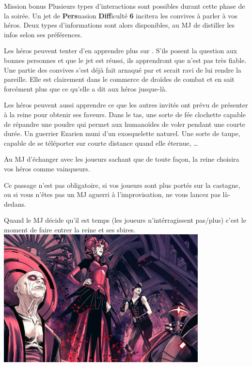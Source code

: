 \begin{paperbox}{Mission bonus}
Plusieurs types d’interactions sont possibles durant cette phase de la soirée. Un jet de \textbf{Pers}uasion \textbf{Diff}iculté \textbf{6} incitera les convives à parler à vos héros. Deux types d’informations sont alors disponibles, au MJ de distiller les infos selon ses préférences.

Les héros peuvent tenter d’en apprendre plus sur . S’ils posent la question aux bonnes personnes et que le jet est réussi, ils apprendront que  n’est pas très fiable. Une partie des convives s’est déjà fait arnaqué par  et serait ravi de lui rendre la pareille. Elle est clairement dans le commerce de droïdes de combat et en sait forcément plus que ce qu’elle a dit aux héros jusque-là.

Les héros peuvent aussi apprendre ce que les autres invités ont prévu de présenter à la reine pour obtenir ses faveurs. Dans le tas, une sorte de fée clochette capable de répandre une poudre qui permet aux humanoïdes de voler pendant une courte durée. Un guerrier Ezarien muni d’un exosquelette naturel. Une sorte de taupe, capable de se téléporter sur courte distance quand elle éternue, \dots

Au MJ d’échanger avec les joueurs sachant que de toute façon, la reine choisira vos héros comme vainqueurs.

Ce passage n’est pas obligatoire, si vos joueurs sont plus portés sur la castagne, ou si vous n’êtes pas un MJ aguerri à l’improvisation, ne vous lancez pas là-dedans.
\end{paperbox}

Quand le MJ décide qu’il est temps (les joueurs n’intérragissent pas/plus) c’est le moment de faire entrer la reine et ses sbires.\\

\noindent\includegraphics[width=\linewidth]{_img/places/queen-with-minions.jpg}

